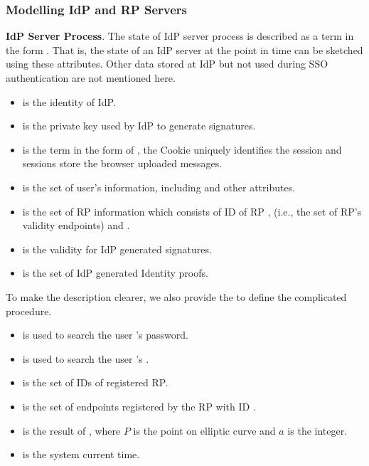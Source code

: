 \subsubsection{Modelling IdP and RP Servers}
\vspace{1mm}\noindent\textbf{IdP Server Process}.
The state of IdP server process is described as a term in the form .
That is,  the state of an IdP server  at the point in time can be sketched using these attributes.
Other data stored at IdP but not used during SSO authentication are not mentioned here.
\begin{itemize}
\setlength\itemsep{-2pt}
\item {} is the identity of IdP.
\item {} is the private key used by IdP to generate signatures.
\item {} is the term in the form of , the Cookie uniquely identifies the session and sessions store the  browser uploaded messages.
\item {} is the set of user's information, including    and other attributes.
\item {} is the set of RP information which consists of ID of RP ,  (i.e., the set of RP's validity endpoints) and .
\item {} is the validity for IdP generated signatures.
\item {} is the set of IdP generated Identity proofs.
\end{itemize}
To make the description clearer, we also provide the  to define the complicated procedure.
\begin{itemize}
\setlength\itemsep{-2pt}
\item {} is used to search the user 's password.
\item {} is used to search the user 's .
\item {} is the set of IDs of registered RP.
\item {} is the set of endpoints registered by the RP with ID .
\item {} is the result of , where $P$ is the point on elliptic curve and $a$ is the integer.
\item {} is the system current time.
\end{itemize}

